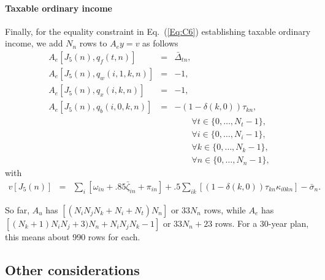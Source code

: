 \documentclass{report}[fleqn,12pt]
\begin{document}
\paragraph*{Taxable ordinary income}
Finally, for the equality constraint in Eq.~(\ref{Eq:C6}) establishing taxable
ordinary income, we add $N_n$ rows to $A_ey = v$ as follows
\begin{eqnarray}
	A_e[J_5(n), q_f(t, n)] &=& \bar{\Delta}_{t n}, \nonumber \\
	A_e[J_5(n), q_w(i, 1, k, n)] &=& -1, \nonumber \\
	A_e[J_5(n), q_x(i, k, n)] &=& -1, \nonumber \\
	A_e[J_5(n), q_b(i, 0, k, n)] &=& -(1-\delta(k, 0))\tau_{kn}, \\
	&&\qquad\forall t \in \{0,\ldots, N_t-1\},\nonumber\\
	&&\qquad\forall i \in \{0,\ldots, N_i-1\},\nonumber\\
	&&\qquad\forall k \in \{0,\ldots, N_k-1\},\nonumber\\
	&&\qquad\forall n \in \{0,\ldots, N_n-1\}, \nonumber
\end{eqnarray}
with
\begin{eqnarray}
	v[J_5(n)] &=& 
	\sum_i [\omega_{in} + .85\bar\zeta_{in}  + \pi_{in}]
	+ .5\sum_{ik} [(1-\delta(k, 0))\tau_{kn}\kappa_{i0kn}]
	- \bar{\sigma}_n.
\end{eqnarray}

So far, $A_u$ has $[(N_iN_jN_k + N_i + N_t)N_n]$ or $33N_n$ rows,
while $A_e$ has $[(N_k+1)N_iN_j + 3)N_n + N_iN_jN_k - 1]$ or $33N_n+23$ rows. For a 30-year
plan, this means about 990 rows for each.

\subsection{Other considerations}
\end{document}

